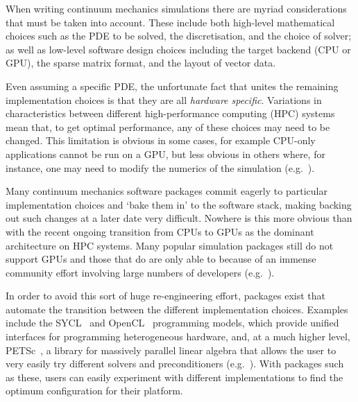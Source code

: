 \documentclass[thesis]{subfiles}
\begin{document}
When writing continuum mechanics simulations there are myriad considerations that must be taken into account.
These include both high-level mathematical choices such as the PDE to be solved, the discretisation, and the choice of solver; as well as low-level software design choices including the target backend (CPU or GPU), the sparse matrix format, and the layout of vector data.

Even assuming a specific PDE, the unfortunate fact that unites the remaining implementation choices is that they are all \emph{hardware specific}.
Variations in characteristics between different high-performance computing (HPC) systems mean that, to get optimal performance, any of these choices may need to be changed.
This limitation is obvious in some cases, for example CPU-only applications cannot be run on a GPU, but less obvious in others where, for instance, one may need to modify the numerics of the simulation (e.g.~\cite{betteridgeCodeGenerationProductive2021}).

Many continuum mechanics software packages commit eagerly to particular implementation choices and `bake them in' to the software stack, making backing out such changes at a later date very difficult.
Nowhere is this more obvious than with the recent ongoing transition from CPUs to GPUs as the dominant architecture on HPC systems.
Many popular simulation packages still do not support GPUs and those that do are only able to because of an immense community effort involving large numbers of developers (e.g.~\cite{millsPETScTAODevelopments2024,millsPerformancePortablePETScGPUbased2020,brownLibCEEDFastAlgebra2021,abdelfattahGPUAlgorithmsEfficient2021}).

In order to avoid this sort of huge re-engineering effort, packages exist that automate the transition between the different implementation choices.
Examples include the SYCL~\cite{SYCL2020Specification2020} and OpenCL~\cite{stoneOpenCLParallelProgramming2010} programming models, which provide unified interfaces for programming heterogeneous hardware, and, at a much higher level, PETSc~\cite{petsc-user-ref,petsc-web-page,petsc-efficient}, a library for massively parallel linear algebra that allows the user to very easily try different solvers and preconditioners (e.g.~\cite{brownComposableLinearSolvers2012,smithPETScSoftwareStrategy}).
With packages such as these, users can easily experiment with different implementations to find the optimum configuration for their platform.
\end{document}
